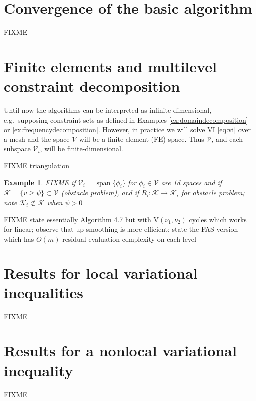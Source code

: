 \documentclass[letterpaper,final,12pt,reqno]{amsart}
\theoremstyle{cstyle}
\theoremstyle{dstyle}
\newtheorem{example}[theorem]{Example}
\numberwithin{equation}{section}
\numberwithin{figure}{section}
\numberwithin{table}{section}
\numberwithin{theorem}{section}
\newcommand{\cK}{\mathcal{K}}
\newcommand{\cV}{\mathcal{V}}
\newcommand{\Span}{\operatorname{span}}
\begin{document}
\section{Convergence of the basic algorithm} \label{sec:convergence}

FIXME


\section{Finite elements and multilevel constraint decomposition} \label{sec:multilevel}

Until now the algorithms can be interpreted as infinite-dimensional, e.g.~supposing constraint sets as defined in Examples \ref{ex:domaindecomposition} or \ref{ex:frequencydecomposition}.  However, in practice we will solve VI \eqref{eq:vi} over a mesh and the space $\cV$ will be a finite element (FE) space.  Thus $\cV$, and each subspace $\cV_i$, will be finite-dimensional.

FIXME triangulation

\begin{example}  FIXME if $\cV_i=\Span\{\phi_i\}$ for $\phi_i\in\cV$ are 1d spaces and if $\cK = \{v \ge \psi\} \subset \cV$ (obstacle problem), and if $R_i : \cK \to \cK_i$ for obstacle problem; note $\cK_i \not\subset \cK$ when $\psi>0$
\end{example}

FIXME state essentially Algorithm 4.7 \cite{GraeserKornhuber2009} but with $\text{V}(\nu_1,\nu_2)$ cycles which works for linear; observe that up-smoothing is more efficient; state the FAS version which has $O(m)$ residual evaluation complexity on each level


\section{Results for local variational inequalities} \label{sec:resultslocal}

FIXME


\section{Results for a nonlocal variational inequality} \label{sec:resultsnonlocal}

FIXME


\small


\end{document}
